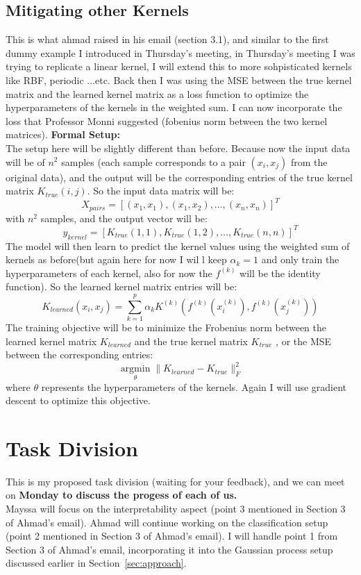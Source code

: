 \documentclass[12pt]{article}
\begin{document}
\subsection{Mitigating other Kernels}
\label{sec:mitigating-kernels}
This is what ahmad raised in his email (section 3.1), and similar to the first dummy example I introduced in Thursday's meeting, in Thursday's meeting I was trying to replicate a linear kernel, I will extend this to more sohpisticated kernels like RBF, periodic ...etc. Back then I was using the MSE between the true kernel matrix and the learned kernel matrix as a loss function to optimize the hyperparameters of the kernels in the weighted sum. I can now incorporate the loss that Professor Monni suggested (fobenius norm between the two kernel matrices). \textbf{Formal Setup:} \\
The setup here will be slightly different than before. Because now the input data will be of $n^2$ samples (each sample corresponds to a pair $(x_i, x_j)$ from the original data), and the output will be the corresponding entries of the true kernel matrix $K_{true}(i,j)$. So the input data matrix will be:
\[X_{pairs} = [(x_1, x_1), (x_1, x_2), \ldots, (x_n, x_n)]^T\]
with $n^2$ samples, and the output vector will be:
\[y_{kernel} = [K_{true}(1,1), K_{true}(1,2), \ldots, K_{true}(n,n)]^T\]
The model will then learn to predict the kernel values using the weighted sum of kernels as before(but again here for now I wil l keep $\alpha_k=1$ and only train the hyperparameters of each kernel, also for now the $f^{(k)}$ will be the identity function). So the learned kernel matrix entries will be:
\[K_{learned}(x_i, x_j) = \sum_{k=1}^{p} \alpha_k K^{(k)}(f^{(k)}(x_i^{(k)}), f^{(k)}(x_j^{(k)}))\]
The training objective will be to minimize the Frobenius norm between the learned kernel matrix $K_{learned}$ and the true kernel matrix $K_{true}$ , or the MSE between the corresponding entries:
\[\operatorname*{argmin}_{\theta} \|K_{learned} - K_{true}\|_F^2\]
where $\theta$ represents the hyperparameters of the kernels. Again I will use gradient descent to optimize this objective. \\
\section{Task Division}
\label{sec:tasks}
This is my proposed task division (waiting for your feedback), and we can meet on \textbf{Monday to discuss the progess of each of us.} \\
Mayssa will focus on the interpretability aspect (point 3 mentioned in Section 3 of Ahmad's email).  
Ahmad will continue working on the classification setup (point 2 mentioned in Section 3 of Ahmad's email).  
I will handle point 1 from Section 3 of Ahmad's email, incorporating it into the Gaussian process setup discussed earlier in Section~\ref{sec:approach}.
\newpage 
\end{document}
